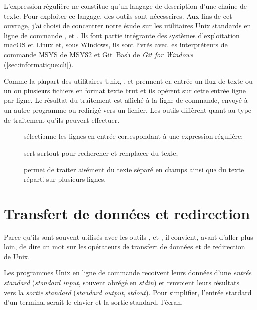 L'expression régulière ne constitue qu'un langage de description d'une
chaine de texte. Pour exploiter ce langage, des outils sont
nécessaires. Aux fins de cet ouvrage, j'ai choisi de concentrer notre
étude sur les utilitaires Unix standards en ligne de commande
,  et . Ils font partie intégrante des
systèmes d'exploitation macOS et Linux et, sous Windows, ils sont
livrés avec les interpréteurs de commande MSYS de MSYS2
et Git~Bash de \emph{Git for Windows}
(\autoref{sec:informatique:cli}).

Comme la plupart des utilitaires Unix, ,  et
 prennent en entrée un flux de texte ou un ou plusieurs
fichiers en format texte brut et ils opèrent sur cette entrée ligne
par ligne. Le résultat du traitement est affiché à la ligne de
commande, envoyé à un autre programme ou redirigé vers un fichier. Les
outils diffèrent quant au type de traitement qu'ils peuvent effectuer.
\begin{description}
\item[] sélectionne les lignes en entrée correspondant à
  une expression régulière;
\item[] sert surtout pour rechercher et remplacer du texte;
\item[] permet de traiter aisément du texte séparé en champs
  ainsi que du texte réparti sur plusieurs lignes.
\end{description}



\section{Transfert de données et redirection}
\label{sec:texte:flux}

Parce qu'ils sont souvent utilisés avec les outils ,
 et , il convient, avant d'aller plus loin, de
dire un mot sur les opérateurs de transfert de données et de
redirection de Unix.

Les programmes Unix en ligne de commande recoivent leurs données d'une
\emph{entrée standard} (\emph{standard
  input}, souvent abrégé en \emph{stdin}) et renvoient leurs résultats
vers la \emph{sortie standard} (\emph{standard output},
\emph{stdout}). Pour simplifier, l'entrée stardard d'un terminal
serait le clavier et la sortie standard, l'écran.

